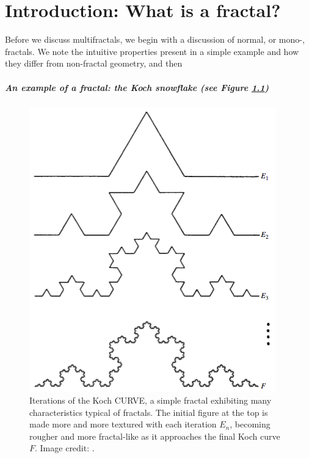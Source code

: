 
\chapter{Introduction: What is a fractal?} %

\label{Chapter1} %



Before we discuss multifractals, we begin with a discussion of normal, or mono-, fractals. We note the intuitive properties present in a simple example and how they differ from non-fractal geometry, and then 

\paragraph{An example of a fractal: the Koch snowflake (see Figure \ref{fig:kochcurve})}\label{fractalexample}

\begin{figure}[h]
\centering
\includegraphics[height=0.6\textwidth]{Chapters/Figures/Kochcurve.png} 
\caption[Koch Curve]{Iterations of the Koch CURVE, a simple fractal exhibiting many characteristics typical of fractals. The initial figure at the top is made more and more textured with each iteration $E_{n}$, becoming rougher and more fractal-like as it approaches the final Koch curve $F$. Image credit: \citep{fractaltextbook}. }\label{fig:kochcurve}
\end{figure}

